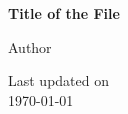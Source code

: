 \begin{titlepage}
\thispagestyle{empty}

\centering
\vspace*{2cm}

{\bfseries\fontsize{40}{48}\selectfont
	Title of the File\par}

\vspace{1.5cm}

{\Large Author\par}

\vfill

{\large Last updated on \\ \today\par}

\end{titlepage}
